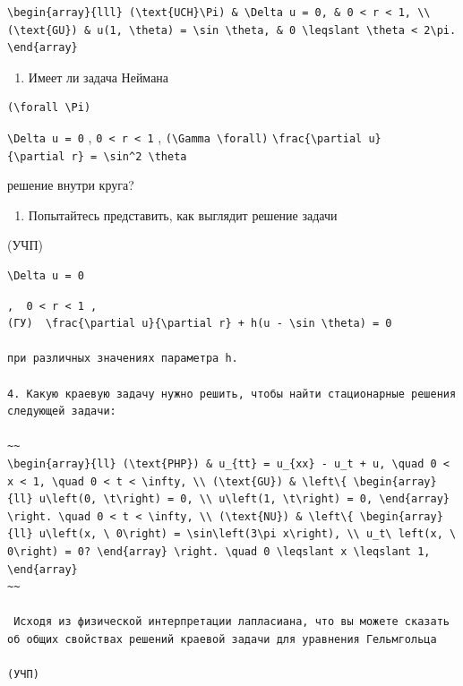 \documentclass[
  ukrainian,
]{article}
\providecommand{\tightlist}{%
  \setlength{\itemsep}{0pt}\setlength{\parskip}{0pt}}
\begin{document}
\begin{verbatim}
\begin{array}{lll} (\text{UCH}\Pi) & \Delta u = 0, & 0 < r < 1, \\ (\text{GU}) & u(1, \theta) = \sin \theta, & 0 \leqslant \theta < 2\pi. \end{array}
\end{verbatim}

\begin{enumerate}
\def\labelenumi{\arabic{enumi}.}
\setcounter{enumi}{1}
\tightlist
\item
  Имеет ли задача Неймана
\end{enumerate}

\begin{verbatim}
(\forall \Pi)
\end{verbatim}

\texttt{\textbackslash{}Delta\ u\ =\ 0} ,
\texttt{0\ \textless{}\ r\ \textless{}\ 1} ,
\texttt{(\textbackslash{}Gamma\ \textbackslash{}forall)}
\texttt{\textbackslash{}frac\{\textbackslash{}partial\ u\}\{\textbackslash{}partial\ r\}\ =\ \textbackslash{}sin\^{}2\ \textbackslash{}theta}

решение внутри круга?

\begin{enumerate}
\def\labelenumi{\arabic{enumi}.}
\setcounter{enumi}{2}
\tightlist
\item
  Попытайтесь представить, как выглядит решение задачи
\end{enumerate}

(УЧП)

\begin{verbatim}
\Delta u = 0
\end{verbatim}

\begin{verbatim}
,  0 < r < 1 ,  
(ГУ)  \frac{\partial u}{\partial r} + h(u - \sin \theta) = 0 

при различных значениях параметра h.

4. Какую краевую задачу нужно решить, чтобы найти стационарные решения следующей задачи:

~~
\begin{array}{ll} (\text{PHP}) & u_{tt} = u_{xx} - u_t + u, \quad 0 < x < 1, \quad 0 < t < \infty, \\ (\text{GU}) & \left\{ \begin{array}{ll} u\left(0, \t\right) = 0, \\ u\left(1, \t\right) = 0, \end{array} \right. \quad 0 < t < \infty, \\ (\text{NU}) & \left\{ \begin{array}{ll} u\left(x, \ 0\right) = \sin\left(3\pi x\right), \\ u_t\ left(x, \ 0\right) = 0? \end{array} \right. \quad 0 \leqslant x \leqslant 1, \end{array}
~~

 Исходя из физической интерпретации лапласиана, что вы можете сказать об общих свойствах решений краевой задачи для уравнения Гельмгольца

(УЧП)
\end{verbatim}
\end{document}
